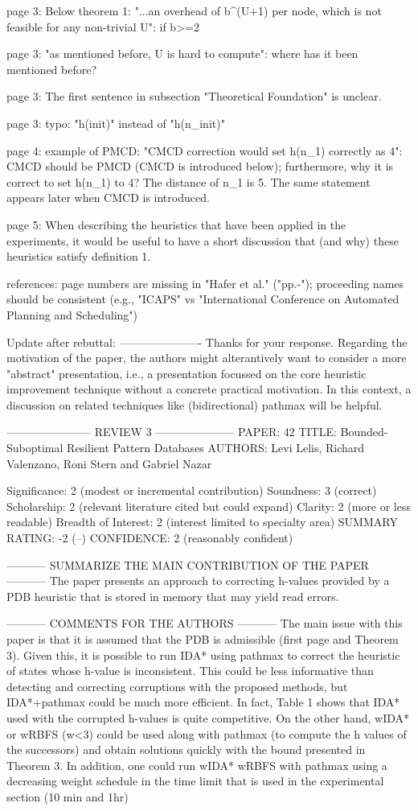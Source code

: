 page 3: Below theorem 1: "...an overhead of b^(U+1) per node, which is
not feasible for any non-trivial U": if b>=2

page 3: "as mentioned before, U is hard to compute": where has it been
mentioned before?

page 3: The first sentence in subsection "Theoretical Foundation" is
unclear.

page 3: typo: "h(init)" instead of "h(n_{init})"

page 4: example of PMCD: "CMCD correction would set h(n_1) correctly
as 4": CMCD should be PMCD (CMCD is introduced below); furthermore,
why it is correct to set h(n_1) to 4? The distance of n_1 is 5. The
same statement appears later when CMCD is introduced.

page 5: When describing the heuristics that have been applied in the
experiments, it would be useful to have a short discussion that (and
why) these heuristics satisfy definition 1.

references: page numbers are missing in "Hafer et al." ("pp.-");
proceeding names should be consistent (e.g., "ICAPS" vs "International
Conference on Automated Planning and Scheduling")

Update after rebuttal:
----------------------
Thanks for your response. Regarding the
motivation of the paper, the authors might alterantively want to
consider a more "abstract" presentation, i.e., a presentation focussed
on the core heuristic improvement technique without a concrete
practical motivation. In this context, a discussion on related
techniques like (bidirectional) pathmax will be helpful.


----------------------- REVIEW 3 ---------------------
PAPER: 42
TITLE: Bounded-Suboptimal Resilient Pattern Databases
AUTHORS: Levi Lelis, Richard Valenzano, Roni Stern and Gabriel Nazar

Significance: 2 (modest or incremental contribution)
Soundness: 3 (correct)
Scholarship: 2 (relevant literature cited but could expand)
Clarity: 2 (more or less readable)
Breadth of Interest: 2 (interest limited to specialty area)
SUMMARY RATING: -2 (--)
CONFIDENCE: 2 (reasonably confident)

----------- SUMMARIZE THE MAIN CONTRIBUTION OF THE PAPER -----------
The paper presents an approach to correcting h-values provided by a
PDB heuristic that is stored in memory that may yield read errors.

----------- COMMENTS FOR THE AUTHORS -----------
The main issue with this paper is that it is assumed that the PDB is
admissible (first page and Theorem 3). Given this, it is possible to
run IDA* using pathmax to correct the heuristic of states whose
h-value is inconsistent. This could be less informative than detecting
and correcting corruptions with the proposed methods, but IDA*+pathmax
could be much more efficient. In fact, Table 1 shows that IDA* used
with the corrupted h-values is quite competitive. On the other hand,
wIDA* or wRBFS (w<3) could be used along with pathmax (to compute the
h values of the successors) and obtain solutions quickly with the
bound presented in Theorem 3. In addition, one could run wIDA* wRBFS
with pathmax using a decreasing weight schedule in the time limit that
is used in the experimental section (10 min and 1hr)

